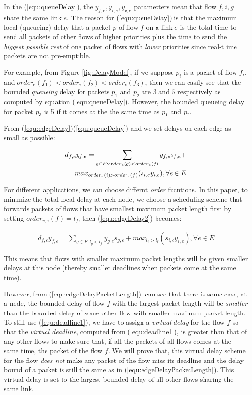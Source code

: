 \documentclass[conference, twocolumn]{IEEEtran}
\theoremstyle{definition}
\begin{document}
In the (\ref{equ:queueDelay}), the $y_{f,e}, y_{i,e}, y_{g,e}$ parametters mean
that flow $f, i, g$ share the same link $e$. The reason for
(\ref{equ:queueDelay}) is that the maximum local (queueing) delay  that a packet
$p$ of flow $f$ on a link $e$ is the total time to send all packets of other
flows of higher priorities plus  the time  to send the {\em biggest
possible rest} of one packet of flows with {\em lower} priorities since real-t
ime packets are not pre-emptible.

For example, from Figure \ref{fig:DelayModel}, if we suppose $p_i$ is a packet
of flow $f_i$, and $order_{e}(f_1) < order_{e}(f_2) < order_{e}(f_3)$, then we can easily see that
the bounded {\em queueing} delay for packets $p_1$ and $p_2$ are 3 and 5
respectively as computed by equation (\ref{equ:queueDelay}). However, the
bounded queueing delay for packet $p_3$ is 5 if it comes at the the same time as $p_1$ and $p_2$.

From (\ref{equ:edgeDelay})(\ref{equ:queueDelay}) and we set delays on
each edge as small as possible:

\begin{eqnarray}\label{equ:edgeDelay2}
d_{f,e}y_{f,e} = \sum_{g \in F:order_e(g) < order_e(f)}y_{f,e}s_{f,e} +
\notag\\  
max_{order_{e}(i)>order_{e}(f)}(s_{i,e}y_{i,e}), \forall e \in E
\end{eqnarray}

For different applications, we can choose differnt {\em order} fucntions. In
this paper, to minimize the total local delay at each node, we choose a
scheduling scheme that forwards packets of flows that have smallest maximum
packet length first by setting $order_{v,e}(f)=l_f$, then
(\ref{equ:edgeDelay2}) becomes:

\begin{eqnarray}\label{equ:edgeDelayPacketLength}
d_{f,e}y_{f,e} = \sum_{g \in F:l_g <
l_f}y_{g,e}s_{g,e} +max_{l_i>l_f}(s_{i,e}y_{i,e}), \forall e \in E
\end{eqnarray}

This means that flows with smaller maximum packet lengths will be given smaller
delays at this node (thereby smaller deadlines when packets come at the same
time).

However, from (\ref{equ:edgeDelayPacketLength}), can see that there is some
case, at a node, the bounded delay of flow $f$ with the largest packet length
will be {\em smaller} than the bounded delay of some other flow with smaller
maximum packet length. To still use (\ref{equ:deadline1}), we have to assign a
{\em virtual delay} for the flow $f$ so that the {\em virtual deadline},
computed from (\ref{equ:deadline1}), is greater than that of any other flows to
make sure that, if all the packets of all flows comes at the same time, the
packet of the flow $f$. We will prove that, this virtual delay scheme for the
flow {\em does not} make any packet of the flow miss its deadline and the delay
bound of a packet is still the same as in (\ref{equ:edgeDelayPacketLength}).
This virtual delay is set to the largest bounded delay of all other flows
sharing the same link.
\end{document}
